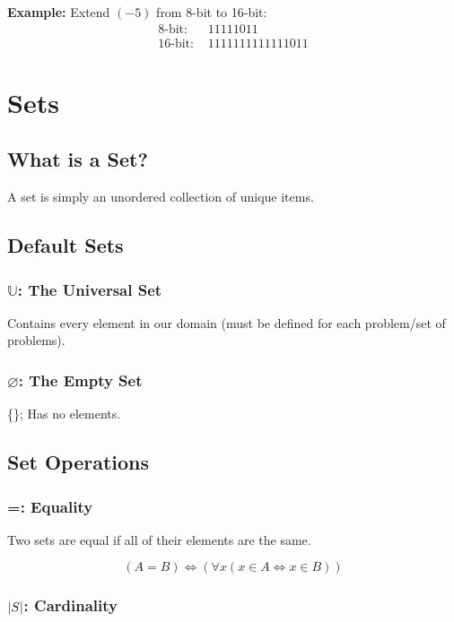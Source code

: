\documentclass{report}
\DeclarePairedDelimiter{\card}{\lvert}{\rvert}
\newcommand{\universal}{\mathbb{U}}
\begin{document}
\textbf{Example:} Extend $(-5)$ from 8-bit to 16-bit:
\begin{align*}
    \text{8-bit: } &11111011 \\
    \text{16-bit: } &1111111111111011
\end{align*}

\chapter{Sets}

\section{What is a Set?}

A set is simply an unordered collection of unique items.

\section{Default Sets}

\subsection{$\universal$: The Universal Set}
Contains every element in our domain (must be defined for each problem/set of problems).

\subsection{$\varnothing$: The Empty Set} 
\{\}; Has no elements.

\section{Set Operations}

\subsection{=: Equality}

Two sets are equal if all of their elements are the same.

\begin{equation}
    (A = B) \iff (\forall x (x \in A \iff x \in B))
\end{equation}

\subsection{$\card{S}$: Cardinality}
\end{document}
